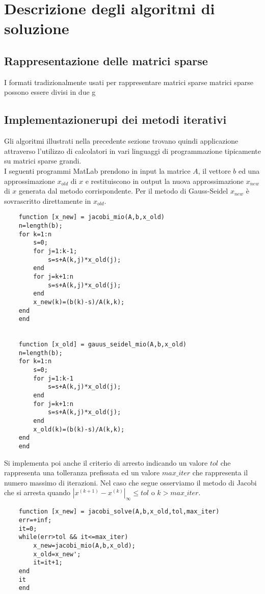 \documentclass[12pt]{article}
\begin{document}
\section{Descrizione degli algoritmi di soluzione}
\subsection{Rappresentazione delle matrici sparse}
I formati tradizionalmente usati per rappresentare matrici sparse matrici sparse possono essere divisi in due g
\subsection{Implementazionerupi dei metodi iterativi}
Gli algoritmi illustrati nella precedente sezione trovano quindi applicazione attraverso l'utilizzo di calcolatori in vari linguaggi di programmazione tipicamente su matrici sparse grandi.\\
I seguenti programmi MatLab prendono in input la matrice \(A\), il vettore \(b\) ed una approssimazione \(x_{old}\) di \(x\) e restituiscono in output la nuova approssimazione \(x_{new}\) di \(x\) generata dal metodo corrispondente. Per il metodo di Gauss-Seidel \(x_{new}\) è sovrascritto direttamente in \(x_{old}\).

\begin{verbatim}
    function [x_new] = jacobi_mio(A,b,x_old)
    n=length(b);
    for k=1:n
        s=0;
        for j=1:k-1;
            s=s+A(k,j)*x_old(j);
        end
        for j=k+1:n
            s=s+A(k,j)*x_old(j);
        end
        x_new(k)=(b(k)-s)/A(k,k);
    end
    end
    
    
    function [x_old] = gauus_seidel_mio(A,b,x_old)
    n=length(b);
    for k=1:n
        s=0;
        for j=1:k-1
            s=s+A(k,j)*x_old(j);
        end
        for j=k+1:n
            s=s+A(k,j)*x_old(j);
        end
        x_old(k)=(b(k)-s)/A(k,k);
    end
    end

\end{verbatim}

Si implementa poi anche il criterio di arresto indicando un valore \(tol\) che rappresenta una tolleranza prefissata ed un valore \(max\_iter\) che rappresenta il numero massimo di iterazioni. Nel caso che segue osserviamo il metodo di Jacobi che si arresta quando \(|x^{(k+1)}-x^{(k)}|_\infty \leq tol\) o \(k > max\_iter\).

\begin{verbatim}
    function [x_new] = jacobi_solve(A,b,x_old,tol,max_iter)
    err=+inf;
    it=0;
    while(err>tol && it<=max_iter)
        x_new=jacobi_mio(A,b,x_old);
        x_old=x_new';
        it=it+1;
    end
    it
    end
\end{verbatim}
\end{document}
